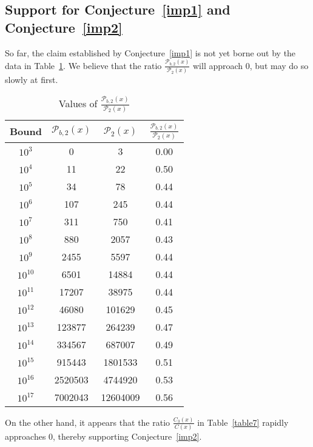 \documentclass[11pt]{article}
\theoremstyle{plain}
\theoremstyle{definition}
\theoremstyle{remark}
\numberwithin{equation}{subsection}
\begin{document}
\subsection{Support for Conjecture~\ref{imp1} and Conjecture~\ref{imp2}}
\indent So far, the claim established by Conjecture~\ref{imp1} is not yet borne out by the data in Table~\ref{table6}. We believe that the ratio $\frac{\mathscr{P}_{b,2}(x)}{\mathscr{P}_2(x)}$ will approach 0, but may do so slowly at first.
\begin{table}[ht]
\caption{Values of $\frac{\mathscr{P}_{b,2}(x)}{\mathscr{P}_2(x)}$}
\centering
\begin{tabular}{ || c | c | c | c || }
    \hline
\textbf{Bound} & \textbf{$\mathscr{P}_{b,2}(x)$} & \textbf{$\mathscr{P}_2(x)$} & \textbf{$\frac{\mathscr{P}_{b,2}(x)}{\mathscr{P}_2(x)}$}\\ \hline
$10^{3}$ & 0 & 3 & 0.00\\
$10^{4}$ & 11 & 22 & 0.50\\
$10^{5}$ & 34 & 78 & 0.44\\
$10^{6}$ & 107 & 245 & 0.44\\
$10^{7}$ & 311 & 750 & 0.41\\
$10^{8}$ & 880 & 2057 & 0.43\\
$10^{9}$ & 2455 & 5597 & 0.44\\
$10^{10}$ & 6501 & 14884 & 0.44\\
$10^{11}$ & 17207 & 38975 & 0.44\\
$10^{12}$ & 46080 & 101629 & 0.45\\
$10^{13}$ & 123877 & 264239 & 0.47\\
$10^{14}$ & 334567 & 687007 & 0.49\\
$10^{15}$ & 915443 & 1801533 & 0.51\\
$10^{16}$ & 2520503 & 4744920 & 0.53\\
$10^{17}$ & 7002043 & 12604009 & 0.56\\ \hline
\end{tabular}
\label{table6}
\end{table}
On the other hand, it appears that the ratio $\frac{C_3(x)}{C(x)}$ in Table~\ref{table7} rapidly approaches $0$, thereby supporting Conjecture~\ref{imp2}.
\end{document}
